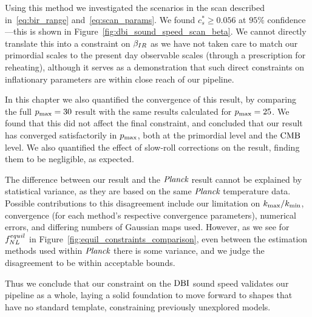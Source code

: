     Using this method we investigated the scenarios in the scan described in~\eqref{eq:bir_range}
    and~\eqref{eq:scan_params}. We found $c_s^*\ge0.056$ at $95\%$ confidence---this
    is shown in Figure~\ref{fig:dbi_sound_speed_scan_beta}.
    We cannot directly translate this into a constraint on $\beta_{IR}$ as we have not
    taken care to match our primordial scales to the present day observable scales
    (through a prescription for reheating), although it serves as a demonstration
    that such direct constraints on inflationary parameters are within close reach
    of our pipeline.


    In this chapter we also quantified the convergence of this result, by comparing the full $p_\text{max}=30$
    result with the same results calculated for $p_\text{max}=25$. We found that this did not affect the
    final constraint, and concluded that our result has converged satisfactorily in $p_\text{max}$,
    both at the primordial level and the $\text{CMB}$ level.
    We also quantified the effect of slow-roll corrections on the result,
    finding them to be negligible, as expected.


    The difference between our result and the $\textit{Planck}$ result cannot be explained by
    statistical variance, as they are based on the same $\textit{Planck}$ temperature data.
    Possible contributions to this disagreement include
    our limitation on ${k_\text{max}}/{k_\text{min}}$,
    convergence (for each method's respective convergence parameters),
    numerical errors, and differing numbers of Gaussian maps used.
    However, as we see for $f^{equil}_{NL}$ in Figure~\ref{fig:equil_constraints_comparison},
    even between the estimation methods used within $\textit{Planck}$ there is some variance,
    and we judge the disagreement to be within acceptable bounds.


    Thus we conclude that our constraint on the $\text{DBI}$ sound speed validates our pipeline as a whole,
    laying a solid foundation to move forward to shapes that have no standard template,
    constraining previously unexplored models.


